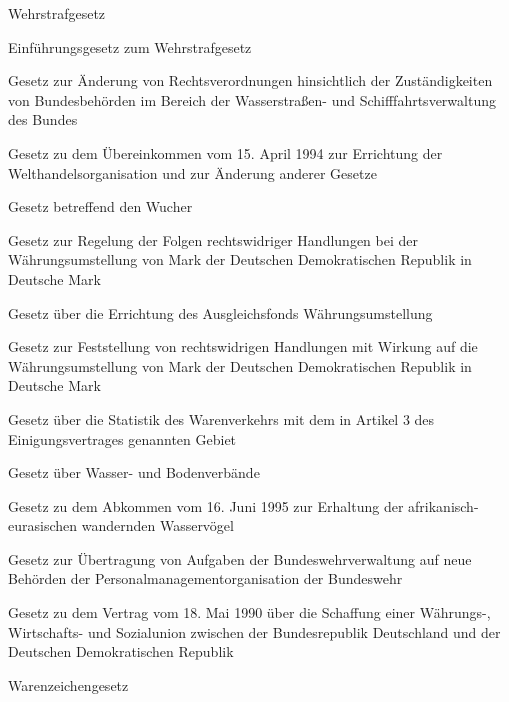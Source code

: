 \item[{WStrG}] Wehrstrafgesetz

\item[{WStrGEG}] Einführungsgesetz zum Wehrstrafgesetz

\item[{WSVZustRVenÄndG}] Gesetz zur Änderung von Rechtsverordnungen hinsichtlich der Zuständigkeiten von Bundesbehörden im Bereich der Wasserstraßen- und Schifffahrtsverwaltung des Bundes

\item[{WTOÜbkG}] Gesetz zu dem Übereinkommen vom 15. April 1994 zur Errichtung der Welthandelsorganisation und zur Änderung anderer Gesetze

\item[{WucherG}] Gesetz betreffend den Wucher

\item[{WUFG}] Gesetz zur Regelung der Folgen rechtswidriger Handlungen bei der Währungsumstellung von Mark der Deutschen Demokratischen Republik in Deutsche Mark

\item[{WUmstAusglFG}] Gesetz über die Errichtung des Ausgleichsfonds Währungsumstellung

\item[{WUmstrwHFG}] Gesetz zur Feststellung von rechtswidrigen Handlungen mit Wirkung auf die Währungsumstellung von Mark der Deutschen Demokratischen Republik in Deutsche Mark

\item[{WVerkDDRStatG}] Gesetz über die Statistik des Warenverkehrs mit dem in Artikel 3 des Einigungsvertrages genannten Gebiet

\item[{WVG}] Gesetz über Wasser- und Bodenverbände

\item[{WVögelAbkG}] Gesetz zu dem Abkommen vom 16. Juni 1995 zur Erhaltung der afrikanisch-eurasischen wandernden Wasservögel

\item[{WVwAÜG}] Gesetz zur Übertragung von Aufgaben der Bundeswehrverwaltung auf neue Behörden der Personalmanagementorganisation der Bundeswehr

\item[{WWSUG}] Gesetz zu dem Vertrag vom 18. Mai 1990 über die Schaffung einer Währungs-, Wirtschafts- und Sozialunion zwischen der Bundesrepublik Deutschland und der Deutschen Demokratischen Republik

\item[{WZG}] Warenzeichengesetz

